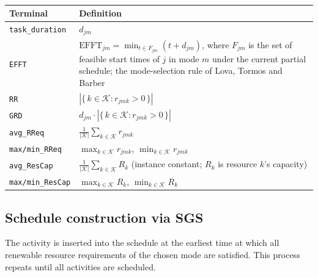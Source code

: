 \begin{table}[t]
  \centering
  \caption[Terminal set of the mode tree]{}
  \label{tab:mode-terminals}
  \small
  \begin{tabularx}{\textwidth}{@{}l X@{}}
    \toprule
    \textbf{Terminal} & \textbf{Definition} \\
    \midrule
    \texttt{task\_duration} & $d_{jm}$ \\
    \texttt{EFFT} & $\mathrm{EFFT}_{jm} = \min_{t \in F_{jm}} (t + d_{jm})$,
      where $F_{jm}$ is the set of feasible start times of $j$ in mode $m$
      under the current partial schedule; the mode-selection rule of Lova,
      Tormos and Barber~\cite{lova2006mrcpsp} \\
    \texttt{RR} & $|\{\,k \in \mathcal{K} : r_{jmk} > 0\,\}|$ \\
    \texttt{GRD} & $d_{jm} \cdot |\{\,k \in \mathcal{K} : r_{jmk} > 0\,\}|$ \\
    \texttt{avg\_RReq} &
      $\frac{1}{|\mathcal{K}|} \sum_{k \in \mathcal{K}} r_{jmk}$ \\
    \texttt{max/min\_RReq} &
      $\max_{k \in \mathcal{K}} r_{jmk}$,\;
      $\min_{k \in \mathcal{K}} r_{jmk}$ \\
    \texttt{avg\_ResCap} &
      $\frac{1}{|\mathcal{K}|} \sum_{k \in \mathcal{K}} R_k$
      (instance constant; $R_k$ is resource $k$'s capacity) \\
    \texttt{max/min\_ResCap} &
      $\max_{k \in \mathcal{K}} R_k$,\;
      $\min_{k \in \mathcal{K}} R_k$ \\
    \bottomrule
  \end{tabularx}
\end{table}

\subsection{Schedule construction via SGS}
\label{subsec:sgs-construction}

The activity is inserted into the schedule at the earliest time at which all renewable resource requirements of the chosen mode are satisfied.
This process repeats until all activities are scheduled.


